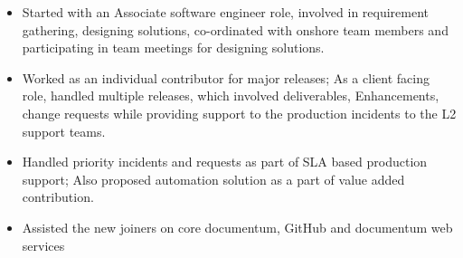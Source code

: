 \documentclass[10pt,a4paper,ragged2e,withhyper]{altacv}
\begin{document}
\begin{paracol}{2}
            \begin{itemize}
                \item Started with an Associate software engineer role, involved in requirement gathering, designing solutions, co-ordinated with onshore team members and participating in team meetings for designing solutions.

                \item Worked as an individual contributor for major releases; As a client facing role,  handled multiple releases, which involved deliverables, Enhancements, change requests while providing support to the production incidents to the L2 support teams. 
                \item Handled priority incidents and requests as part of SLA based production support; Also proposed automation solution as a part of value added contribution.
                \item Assisted the new joiners on core documentum, GitHub and documentum web services
            \end{itemize}
          
            
        
        
        
        

\end{paracol}
\end{document}
